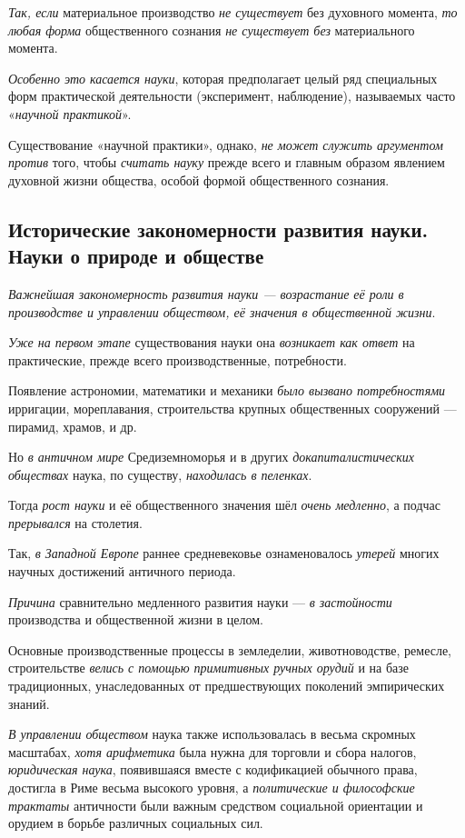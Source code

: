 \documentclass[a4paper,14pt,russian]{extreport}
\begin{document}
\emph{Так, если} материальное производство \emph{не существует} без духовного момента, \emph{то любая форма} общественного сознания \emph{не существует без} материального момента.

\emph{Особенно это касается науки}, которая предполагает целый ряд специальных форм практической деятельности (эксперимент, наблюдение), называемых часто «\emph{научной практикой}».

Существование «научной практики», однако, \emph{не может служить аргументом против} того, чтобы \emph{считать науку} прежде всего и главным образом явлением духовной жизни общества, особой формой общественного сознания.

\subsection{Исторические закономерности развития науки. Науки о природе и обществе}

\emph{Важнейшая закономерность развития науки --- возрастание её роли в производстве и управлении обществом, её значения в общественной жизни}.

\emph{Уже на первом этапе} существования науки она \emph{возникает как ответ} на практические, прежде всего производственные, потребности.

Появление астрономии, математики и механики \emph{было вызвано потребностями} ирригации, мореплавания, строительства крупных общественных сооружений --- пирамид, храмов, и др.

Но \emph{в античном мире} Средиземноморья и в других \emph{докапиталистических обществах} наука, по существу, \emph{находилась в пеленках}.

Тогда \emph{рост науки} и её общественного значения шёл \emph{очень медленно}, а подчас \emph{прерывался} на столетия.

Так, \emph{в Западной Европе} раннее средневековье ознаменовалось \emph{утерей} многих научных достижений античного периода.

\emph{Причина} сравнительно медленного развития науки --- \emph{в застойности} производства и общественной жизни в целом.

Основные производственные процессы в земледелии, животноводстве, ремесле, строительстве \emph{велись с помощью примитивных ручных орудий} и на базе традиционных, унаследованных от предшествующих поколений эмпирических знаний.

\emph{В управлении обществом} наука также использовалась в весьма скромных масштабах, \emph{хотя арифметика} была нужна для торговли и сбора налогов, \emph{юридическая наука}, появившаяся вместе с кодификацией обычного права, достигла в Риме весьма высокого уровня, а \emph{политические и философские трактаты} античности были важным средством социальной ориентации и орудием в борьбе различных социальных сил.
\end{document}
